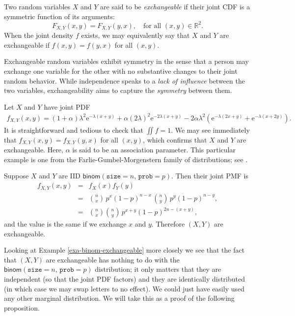 Two random variables \(X\) and \(Y\) are said to be \emph{exchangeable} if
their joint CDF is a symmetric function of its arguments:
\begin{equation}
F_{X,Y}(x,y)=F_{X,Y}(y,x),\quad \mbox{for all }(x,y)\in\mathbb{R}^{2}.
\end{equation} 
When the joint density \(f\) exists, we may equivalently say that \(X\) and \(Y\) are exchangeable if \(f(x,y)=f(y,x)\) for all \((x,y)\).

Exchangeable random variables exhibit symmetry in the sense that a
person may exchange one variable for the other with no substantive
changes to their joint random behavior. While independence speaks to a
\emph{lack of influence} between the two variables, exchangeability aims to
capture the \emph{symmetry} between them.


Let \(X\) and \(Y\) have joint PDF
\begin{multline}
f_{X,Y}(x,y)=(1+\alpha)\lambda^{2}\mathrm{e}^{-\lambda(x+y)}+\alpha(2\lambda)^{2}\mathrm{e}^{-2\lambda(x+y)}-2\alpha\lambda^{2}\left(\mathrm{e}^{-\lambda(2x+y)}+\mathrm{e}^{-\lambda(x+2y)}\right).
\end{multline}
It is straightforward and tedious to check that \(\iint f=1\). We may
see immediately that \(f_{X,Y}(x,y)=f_{X,Y}(y,x)\) for all \((x,y)\),
which confirms that \(X\) and \(Y\) are exchangeable. Here, \(\alpha\)
is said to be an association parameter. This particular example is one
from the Farlie-Gumbel-Morgenstern family of distributions; see
\cite{Kotz2000}.


\label{exa-binom-exchangeable} Suppose \(X\) and \(Y\) are IID
\(\mathsf{binom}(\mathtt{size}=n,\,\mathtt{prob}=p)\). Then their
joint PMF is
\begin{eqnarray*}
f_{X,Y}(x,y) & = & f_{X}(x)f_{Y}(y)\\
 & = & {n \choose x}\, p^{x}(1-p)^{n-x}\,{n \choose y}\, p^{y}(1-p)^{n-y},\\
 & = & {n \choose x}{n \choose y}\, p^{x+y}(1-p)^{2n-(x+y)},
\end{eqnarray*}
and the value is the same if we exchange \(x\) and \(y\). Therefore
\((X,Y)\) are exchangeable.


Looking at Example \ref{exa-binom-exchangeable} more closely we see that the
fact that \((X,Y)\) are exchangeable has nothing to do with the
\(\mathsf{binom}(\mathtt{size}=n,\,\mathtt{prob}=p)\) distribution; it
only matters that they are independent (so that the joint PDF factors)
and they are identically distributed (in which case we may swap
letters to no effect). We could just have easily used any other
marginal distribution. We will take this as a proof of the following
proposition.

